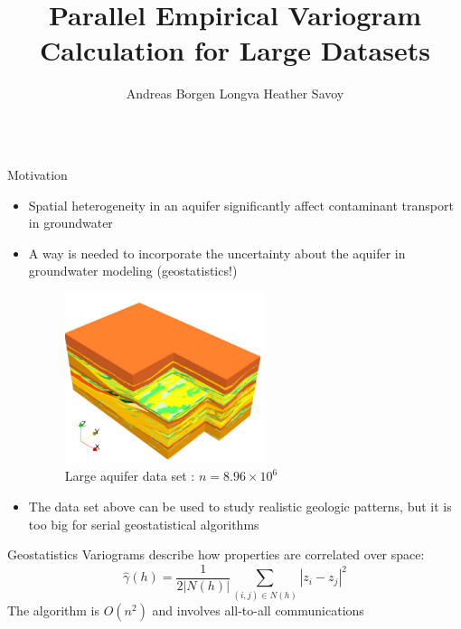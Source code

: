 \documentclass[serif,mathserif,final]{beamer}
\title{Parallel Empirical Variogram Calculation for Large Datasets}
\author{Andreas Borgen Longva \quad Heather Savoy}
\institute{University of California, Berkeley}
\begin{document}
\begin{frame}{}
  \begin{columns}[t]

    \begin{column}{0.32\linewidth}

      \begin{block}{Motivation}
   
	 \begin{itemize}
	 	\item Spatial heterogeneity in an aquifer significantly affect contaminant transport in groundwater
		\item A way is needed to incorporate the uncertainty about the aquifer in groundwater modeling (geostatistics!)
         
         \begin{figure}[htbp]
            \centering
            \includegraphics[height=5cm]{herten.png} %
            \caption{Large aquifer data set : $n=8.96\times 10^6$ \cite{Comunian2011a}}
            \label{fig:example}
         \end{figure}
         
         \item The data set above can be used to study realistic geologic patterns, but it is too big for serial geostatistical algorithms
          \end{itemize}
      \end{block}

      \begin{block}{Geostatistics}
      Variograms describe how properties are correlated over space:
        \begin{equation*}
		\hat{\gamma}(h)=\frac{1}{2|N(h)|}\sum_{(i,j)\in N(h)} |z_i-z_j|^2
	\end{equation*}
	The algorithm is $O(n^2)$ and involves all-to-all communications
      \end{block}
  


\end{column}
\end{columns}
\end{frame}
\end{document}
